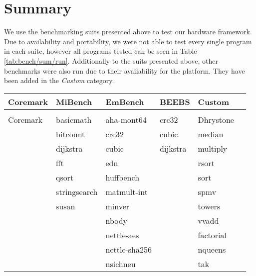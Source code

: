 \documentclass[../bachelor_paper.tex]{subfiles}
\begin{document}
\section{Summary}
    \label{sec:bench/sum}
We use the benchmarking suits presented above to test our hardware framework. Due to availability and portability, we were not able to test every single program in each suite, however all programs tested can be seen in Table \ref{tab:bench/sum/run}. Additionally to the suits presented above, other benchmarks were also run due to their availability for the platform. They have been added in the \emph{Custom} category.

\begin{table}
    \centering
    \begin{tabular}{llllll}
        \textbf{Coremark}   & \textbf{MiBench}  & \textbf{EmBench}  & \textbf{BEEBS}    & \textbf{Custom}   \\
        \hline\\[-0.9em]
        Coremark            & basicmath         & aha-mont64        & crc32             & Dhrystone         \\
                            & bitcount          & crc32             & cubic             & median            \\
                            & dijkstra          & cubic             & dijkstra          & multiply          \\
                            & fft               & edn               &                   & rsort             \\
                            & qsort             & huffbench         &                   & sort              \\
                            & stringsearch      & matmult-int       &                   & spmv              \\
                            & susan             & minver            &                   & towers            \\
                            &                   & nbody             &                   & vvadd             \\
                            &                   & nettle-aes        &                   & factorial         \\
                            &                   & nettle-sha256     &                   & nqueens           \\
                            &                   & nsichneu          &                   & tak               \\

\end{tabular}
\end{table}
\end{document}

